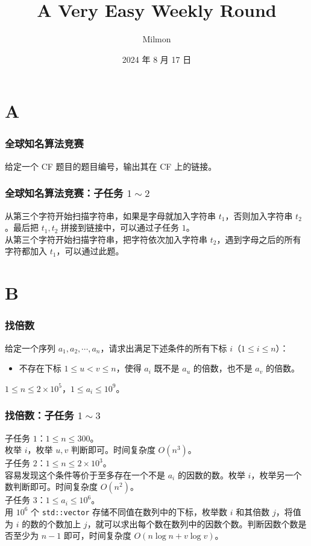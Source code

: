 \documentclass{beamer}
\title[A Very Easy Weekly Round]{A Very Easy Weekly Round}
\author{Milmon}
\institute[Hailiang Junior High School]
{
Hailiang Junior High School
}
\date{2024 年 8 月 17 日}
\begin{document}
\begin{frame}
\titlepage
\end{frame}

\section{A}

\begin{frame}
\frametitle{全球知名算法竞赛}
给定一个 CF 题目的题目编号，输出其在 CF 上的链接。
\end{frame}

\begin{frame}
\frametitle{全球知名算法竞赛：子任务 $1 \sim 2$}
从第三个字符开始扫描字符串，如果是字母就加入字符串 $t_1$，否则加入字符串 $t_2$。最后把 $t_1,t_2$ 拼接到链接中，可以通过子任务 $1$。\\
\pause
从第三个字符开始扫描字符串，把字符依次加入字符串 $t_2$，遇到字母之后的所有字符都加入 $t_1$，可以通过此题。
\end{frame}

\section{B}

\begin{frame}
\frametitle{找倍数}
给定一个序列 $a_1, a_2, \cdots, a_n$，请求出满足下述条件的所有下标 $i$（$1 \leq i \leq n$）：
\begin{itemize}
\item 不存在下标 $1 \leq u < v \leq n$，使得 $a_i$ 既不是 $a_u$ 的倍数，也不是 $a_v$ 的倍数。
\end{itemize}
$1 \leq n \leq 2 \times 10^5$，$1 \leq a_i \leq 10^9$。
\end{frame}

\begin{frame}
\frametitle{找倍数：子任务 $1 \sim 3$}
子任务 $1$：$1 \leq n \leq 300$。 \\
\pause
枚举 $i$，枚举 $u,v$ 判断即可。时间复杂度 $O(n^3)$。\\
\pause
子任务 $2$：$1 \leq n \leq 2 \times 10^3$。 \\
\pause
容易发现这个条件等价于至多存在一个不是 $a_i$ 的因数的数。枚举 $i$，枚举另一个数判断即可。时间复杂度 $O(n^2)$。 \\
\pause
子任务 $3$：$1 \leq a_i \leq 10^6$。\\
\pause
用 $10^6$ 个 \texttt{std::vector} 存储不同值在数列中的下标，枚举数 $i$ 和其倍数 $j$，将值为 $i$ 的数的个数加上 $j$，就可以求出每个数在数列中的因数个数。判断因数个数是否至少为 $n-1$ 即可，时间复杂度 $O(n \log n + v \log v)$。
\end{frame}
\end{document}

